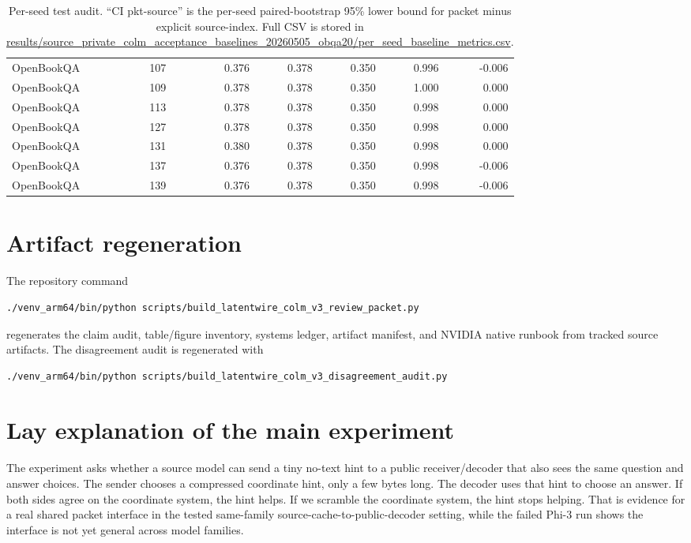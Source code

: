 \documentclass{article}
\newcommand{\obqa}{OpenBookQA}
\begin{document}
\begin{table}[h]
\begin{tabular}{llrrrrr}
    \obqa{} & 107 & 0.376 & 0.378 & 0.350 & 0.996 & -0.006 \\
    \obqa{} & 109 & 0.378 & 0.378 & 0.350 & 1.000 & 0.000 \\
    \obqa{} & 113 & 0.378 & 0.378 & 0.350 & 0.998 & 0.000 \\
    \obqa{} & 127 & 0.378 & 0.378 & 0.350 & 0.998 & 0.000 \\
    \obqa{} & 131 & 0.380 & 0.378 & 0.350 & 0.998 & 0.000 \\
    \obqa{} & 137 & 0.376 & 0.378 & 0.350 & 0.998 & -0.006 \\
    \obqa{} & 139 & 0.376 & 0.378 & 0.350 & 0.998 & -0.006 \\
    \bottomrule
  \end{tabular}
  \caption{Per-seed test audit. ``CI pkt-source'' is the per-seed paired-bootstrap 95\% lower bound for packet minus explicit source-index. Full CSV is stored in \url{results/source_private_colm_acceptance_baselines_20260505_obqa20/per_seed_baseline_metrics.csv}.}
  \label{tab:per-seed}
\end{table}

\section{Artifact regeneration}

The repository command
\begin{verbatim}
./venv_arm64/bin/python scripts/build_latentwire_colm_v3_review_packet.py
\end{verbatim}
regenerates the claim audit, table/figure inventory, systems ledger, artifact manifest, and NVIDIA native runbook from tracked source artifacts. The disagreement audit is regenerated with
\begin{verbatim}
./venv_arm64/bin/python scripts/build_latentwire_colm_v3_disagreement_audit.py
\end{verbatim}

\section{Lay explanation of the main experiment}

The experiment asks whether a source model can send a tiny no-text hint to a public receiver/decoder that also sees the same question and answer choices. The sender chooses a compressed coordinate hint, only a few bytes long. The decoder uses that hint to choose an answer. If both sides agree on the coordinate system, the hint helps. If we scramble the coordinate system, the hint stops helping. That is evidence for a real shared packet interface in the tested same-family source-cache-to-public-decoder setting, while the failed Phi-3 run shows the interface is not yet general across model families.
\end{document}

